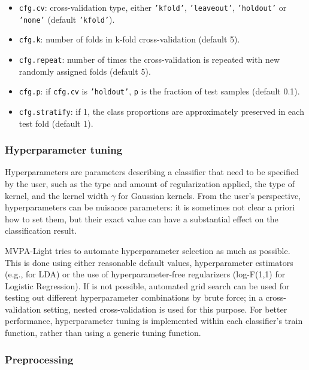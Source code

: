 \documentclass[utf8]{frontiersSCNS} %
\newcommand{\ttt}[1]{\texttt{#1}}
\begin{document}
\begin{itemize}
    \item \ttt{cfg.cv}: cross-validation type, either \ttt{'kfold'}, \ttt{'leaveout'}, \ttt{'holdout'} or \ttt{'none'} (default \ttt{'kfold'}).
    \item \ttt{cfg.k}: number of folds in k-fold cross-validation (default 5).
    \item \ttt{cfg.repeat}: number of times the cross-validation is repeated with new randomly assigned folds (default 5).
    \item \ttt{cfg.p}: if \ttt{cfg.cv} is \ttt{'holdout'}, \ttt{p} is the fraction of test samples (default 0.1).
    \item \ttt{cfg.stratify}: if 1, the class proportions are approximately preserved in each test fold (default 1).
\end{itemize}

\subsubsection{Hyperparameter tuning}

Hyperparameters are parameters describing a classifier that need to be specified by the user, such as the type and amount of regularization applied, the type of kernel, and the kernel width $\gamma$ for Gaussian kernels. From the user's perspective, hyperparameters can be nuisance parameters: it is sometimes not clear a priori how to set them, but their exact value can have a substantial effect on the classification result.

MVPA-Light tries to automate hyperparameter selection as much as possible. This is done using either reasonable default values, hyperparameter estimators (e.g., \cite{Ledoit2003HoneyMatrix} for LDA) or the use of  hyperparameter-free regularizers (log-F(1,1) for Logistic Regression). If is not possible, automated grid search can be used for testing out different hyperparameter combinations by brute force; in a cross-validation setting, nested cross-validation is used for this purpose. For better performance, hyperparameter tuning is implemented within each classifier's train function, rather than using a generic tuning function.

\subsubsection{Preprocessing}\label{sec:preprocessing}
\end{document}
